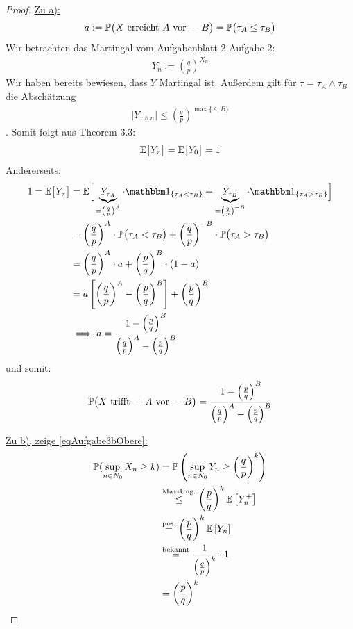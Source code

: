 \documentclass[12pt,a4paper]{article}
\begin{document}
\begin{proof}
\underline{Zu a):}\\
\begin{align*}
a:=\P\big( X\text{ erreicht }A\text{ vor }-B\big)=\P\big(\tau_A\leq\tau_B\big)
\end{align*}
Wir betrachten das Martingal vom Aufgabenblatt 2 Aufgabe 2:
\begin{align*}
	Y_n := \left(\frac{q}{p}\right)^{X_n}
\end{align*}
Wir haben bereits bewiesen, dass $Y$ Martingal ist. Außerdem gilt für \enter$\tau=\tau_A\wedge\tau_B$ die Abschätzung
\begin{align*}
	\big|Y_{\tau\wedge n}\big|\leq\left(\frac{q}{p}\right)^{\max\lbrace A,B\rbrace}
\end{align*}. Somit folgt aus Theorem 3.3:
\begin{align*}
\E\big[Y_\tau\big]=\E\big[Y_0\big]=1
\end{align*}
Andererseits: 
\begin{align*}
	1=\E\big[Y_\tau\big]&=\E\Big[\underbrace{Y_{\tau_A}}_{=\left(\frac{q}{p}\right)^A}\cdot\indi_{\lbrace\tau_A<\tau_B\rbrace}+\underbrace{Y_{\tau_B}}_{=\left(\frac{q}{p}\right)^{-B}}\cdot\indi_{\lbrace\tau_A>\tau_B\rbrace}\Big]\\
&=\left(\frac{q}{p}\right)^A\cdot\P\big(\tau_A<\tau_B\big)+\left(\frac{q}{p}\right)^{-B}\cdot\P\big(\tau_A>\tau_B\big)\\
&=\left(\frac{q}{p}\right)^A\cdot a+ \left(\frac{p}{q}\right)^{B}\cdot(1-a)\\
&=a\left[\left(\frac{q}{p}\right)^A - \left(\frac{p}{q}\right)^B\right]+ \left(\frac{p}{q}\right)^B\\
&\implies
	a=\frac{1-\left(\frac{p}{q}\right)^B}{\left(\frac{q}{p}\right)^A-\left(\frac{p}{q}\right)^B}
\end{align*}
und somit:
\begin{align*}
\P\big(X\text{ trifft }+A\text{ vor }-B\big)&=
	\frac{1-\left(\frac{p}{q}\right)^B}{\left(\frac{q}{p}\right)^A-\left(\frac{p}{q}\right)^B}
\\
\end{align*}

\underline{Zu b), zeige \eqref{eqAufgabe3bObere}:}\\

\begin{align*}
	\P(\sup\limits_{n\in N_0} X_n \geq k) &=
	\P\left(\sup\limits_{n\in N_0} Y_n \geq \left(\frac{q}{p}\right)^k\right) \\
	&\stackrel{\text{Max-Ung.}}{\leq}
	\left(\frac{p}{q}\right)^k\E\left[Y_n^+\right] \\
	&\stackeq{\text{pos.}}
	\left(\frac{p}{q}\right)^k\E\left[Y_n\right] \\
	&\stackeq{\text{bekannt}}
	\frac{1}{\left(\frac{q}{p}\right)^k}\cdot1 \\
	&=\left(\frac{p}{q}\right)^k
\end{align*}


\end{proof}
\end{document}
